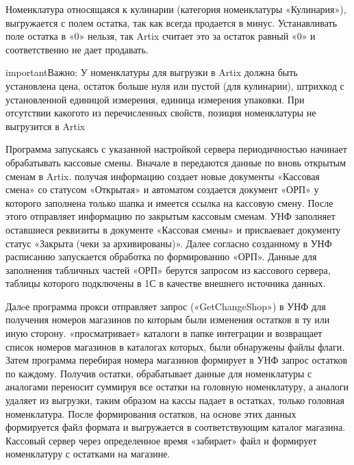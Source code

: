 \documentclass[letterpaper,10pt,russian]{sphinxmanual}
\begin{document}
\sphinxAtStartPar
Номенклатура относящаяся к кулинарии (категория номенклатуры «Кулинария»), выгружается с  полем остатка, так как всегда продается в минус. Устанавливать
поле остатка в «0» нельзя, так Artix считает это за остаток равный «0» и соответственно не дает продавать.

\begin{sphinxadmonition}{important}{Важно:}
\sphinxAtStartPar
У номенклатуры для выгрузки в Artix должна быть установлена цена, остаток больше нуля или пустой (для кулинарии), штрихкод с установленной единицой измерения,
единица измерения упаковки. При отсутствии какого\sphinxhyphen{}то из перечисленных свойств, позиция номенклатуры не выгрузится в Artix
\end{sphinxadmonition}

\sphinxAtStartPar
Программа  запускаясь с указанной настройкой сервера периодичностью начинает обрабатывать кассовые смены.
Вначале в  передаются данные по вновь открытым сменам в Artix.  получая информацию создает новые документы «Кассовая смена» со статусом
«Открытая» и автоматом создается документ «ОРП» у которого заполнена только шапка и имеется ссылка на кассовую смену.
После этого  отправляет информацию по закрытым кассовым сменам. УНФ заполняет оставшиеся реквизиты в документе «Кассовая смены» и присваевает
документу статус «Закрыта (чеки за архивированы)».
Далее согласно созданному в УНФ расписанию запускается обработка по формированию «ОРП». Данные для заполнения табличных частей «ОРП» берутся запросом из
кассового сервера, таблицы которого подключены в 1С в качестве внешнего источника данных.

\sphinxAtStartPar
Далeе программа прокси  отправляет запрос («GetChangeShop») в УНФ для получения номеров магазинов по которым были изменения остатков в ту
или иную сторону.  «просматривает» каталоги в папке интеграции и возвращает список номеров магазинов в каталогах которых, были обнаружены
файлы флаги.
Затем программа  перебирая номера магазинов формирует в УНФ запрос остатков по каждому. Получив остатки,  обрабатывает данные \sphinxhyphen{}
для номенклатуры с аналогами переносит суммируя все остатки на головную номенклатуру, а аналоги удаляет из выгрузки, таким образом на кассы падает в остатках, только
головная номенклатура.
После формирования остатков, на основе этих данных формируется файл формата  и выгружается в соответствующим каталог магазина.
Кассовый сервер через определенное время «забирает» файл и формирует номенклатуру с остатками на магазине.
\end{document}
